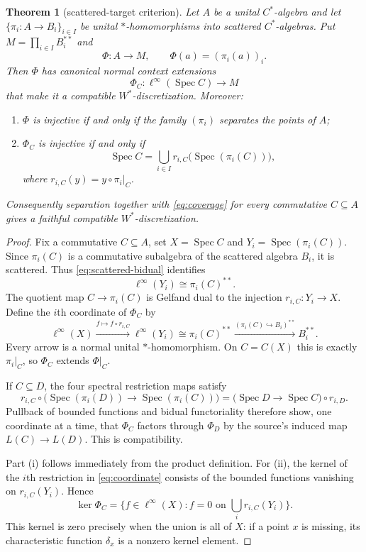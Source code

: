 \documentclass[11pt]{article}
\newtheorem{theorem}{Theorem}
\newcommand{\Spec}{\operatorname{Spec}}
\begin{document}
\begin{theorem}[scattered-target criterion]\label{thm:criterion}
Let $A$ be a unital $C^*$-algebra and let
$\{\pi_i:A\to B_i\}_{i\in I}$ be unital $*$-homomorphisms into scattered
$C^*$-algebras.  Put $M=\prod_{i\in I}B_i^{**}$ and
\[
 \Phi:A\longrightarrow M,
 \qquad \Phi(a)=(\pi_i(a))_i.
\]
Then $\Phi$ has canonical normal context extensions
\[
 \Phi_C:\ell^\infty(\Spec C)\longrightarrow M
\]
that make it a compatible $W^*$-discretization.  Moreover:
\begin{enumerate}[label=\textup{(\roman*)}]
\item $\Phi$ is injective if and only if the family $(\pi_i)$ separates the
points of $A$;
\item $\Phi_C$ is injective if and only if
\begin{equation}\label{eq:coverage}
 \Spec C=\bigcup_{i\in I}
 r_{i,C}\bigl(\Spec(\pi_i(C))\bigr),
\end{equation}
where $r_{i,C}(y)=y\circ\pi_i|_C$.
\end{enumerate}
Consequently separation together with \eqref{eq:coverage} for every
commutative $C\subseteq A$ gives a faithful compatible $W^*$-discretization.
\end{theorem}

\begin{proof}
Fix a commutative $C\subseteq A$, set $X=\Spec C$ and
$Y_i=\Spec(\pi_i(C))$.  Since $\pi_i(C)$ is a commutative subalgebra of the
scattered algebra $B_i$, it is scattered.  Thus \eqref{eq:scattered-bidual}
identifies
\[
 \ell^\infty(Y_i)\cong \pi_i(C)^{**}.
\]
The quotient map $C\to\pi_i(C)$ is Gelfand dual to the injection
$r_{i,C}:Y_i\to X$.  Define the $i$th coordinate of $\Phi_C$ by
\begin{equation}\label{eq:coordinate}
 \ell^\infty(X)\xrightarrow{f\mapsto f\circ r_{i,C}}
 \ell^\infty(Y_i)\cong\pi_i(C)^{**}
 \xrightarrow{(\pi_i(C)\hookrightarrow B_i)^{**}}B_i^{**}.
\end{equation}
Every arrow is a normal unital $*$-homomorphism.  On $C=C(X)$ this is exactly
$\pi_i|_C$, so $\Phi_C$ extends $\Phi|_C$.

If $C\subseteq D$, the four spectral restriction maps satisfy
\[
 r_{i,C}\circ\bigl(\Spec(\pi_i(D))\to\Spec(\pi_i(C))\bigr)
 =\bigl(\Spec D\to\Spec C\bigr)\circ r_{i,D}.
\]
Pullback of bounded functions and bidual functoriality therefore show, one
coordinate at a time, that $\Phi_C$ factors through $\Phi_D$ by the source's
induced map $L(C)\to L(D)$.  This is compatibility.

Part (i) follows immediately from the product definition.  For (ii), the
kernel of the $i$th restriction in \eqref{eq:coordinate} consists of the
bounded functions vanishing on $r_{i,C}(Y_i)$.  Hence
\[
 \ker\Phi_C=\{f\in\ell^\infty(X):f=0\text{ on }
 \textstyle\bigcup_i r_{i,C}(Y_i)\}.
\]
This kernel is zero precisely when the union is all of $X$: if a point $x$ is
missing, its characteristic function $\delta_x$ is a nonzero kernel element.
\end{proof}
\end{document}
